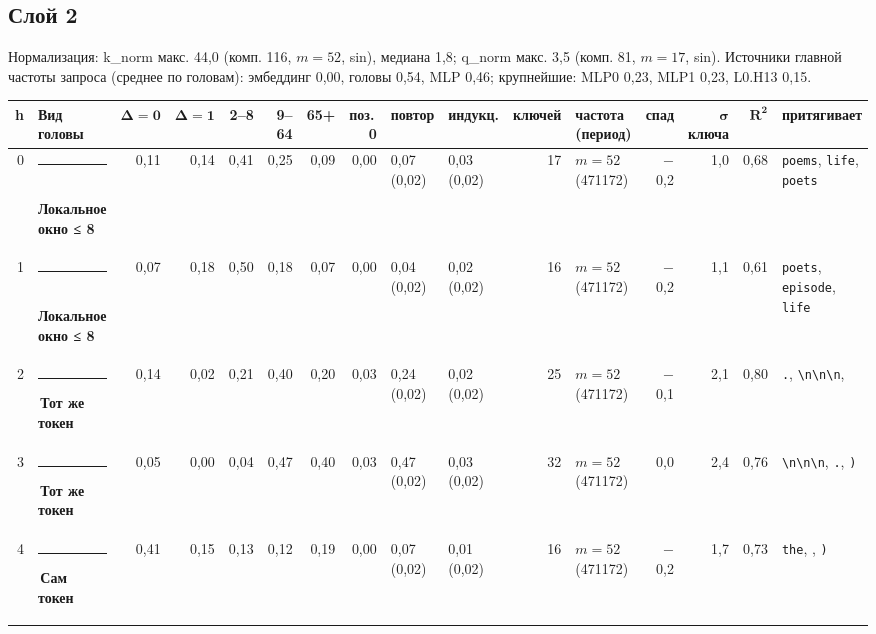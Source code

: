\documentclass[10pt]{article}
\begin{document}
\noindent\begin{minipage}{\linewidth}
\subsection*{Слой 2}
{\small\color{ink2} Нормализация: k\_norm макс. 44,0 (комп. 116, $m{=}52$, sin), медиана 1,8; q\_norm макс. 3,5 (комп. 81, $m{=}17$, sin). Источники главной частоты запроса (среднее по головам): эмбеддинг 0,00, головы 0,54, MLP 0,46; крупнейшие: MLP0 0,23, MLP1 0,23, L0.H13 0,15.}
\begin{center}{\footnotesize\begin{tabular}{|r|l|r|r|r|r|r|r|l|l|r|l|r|r|r|l|}
\hline
\rowcolor{head}\textbf{h} & \textbf{Вид головы} & $\boldsymbol{\Delta{=}0}$ & $\boldsymbol{\Delta{=}1}$ & \textbf{2–8} & \textbf{9–64} & \textbf{65+} & \textbf{поз.\,0} & \textbf{повтор} & \textbf{индукц.} & \textbf{ключей} & \textbf{частота (период)} & \textbf{спад} & $\boldsymbol{\sigma}$ \textbf{ключа} & $\boldsymbol{R^2}$ & \textbf{притягивает} \\ \hline
0 & \textcolor[HTML]{1BAF7A}{\rule{0.62em}{0.62em}}\,\textbf{Локальное окно ≤ 8} & 0,11 & 0,14 & 0,41 & 0,25 & 0,09 & 0,00 & 0,07 (0,02) & 0,03 (0,02) & 17 & $m{=}52$ (471172) & $-$0,2 & 1,0 & 0,68 & \texttt{\textvisiblespace{}poems}, \texttt{\textvisiblespace{}life}, \texttt{\textvisiblespace{}poets} \\ \hline
1 & \textcolor[HTML]{1BAF7A}{\rule{0.62em}{0.62em}}\,\textbf{Локальное окно ≤ 8} & 0,07 & 0,18 & 0,50 & 0,18 & 0,07 & 0,00 & 0,04 (0,02) & 0,02 (0,02) & 16 & $m{=}52$ (471172) & $-$0,2 & 1,1 & 0,61 & \texttt{\textvisiblespace{}poets}, \texttt{\textvisiblespace{}episode}, \texttt{\textvisiblespace{}life} \\ \hline
2 & \textcolor[HTML]{E87BA4}{\rule{0.62em}{0.62em}}\,\textbf{Тот же токен} & 0,14 & 0,02 & 0,21 & 0,40 & 0,20 & 0,03 & 0,24 (0,02) & 0,02 (0,02) & 25 & $m{=}52$ (471172) & $-$0,1 & 2,1 & 0,80 & \texttt{\textvisiblespace{}.}, \texttt{\textvisiblespace{}\textbackslash{}n\textbackslash{}n\textbackslash{}n}, \texttt{\textvisiblespace{}} \\ \hline
3 & \textcolor[HTML]{E87BA4}{\rule{0.62em}{0.62em}}\,\textbf{Тот же токен} & 0,05 & 0,00 & 0,04 & 0,47 & 0,40 & 0,03 & 0,47 (0,02) & 0,03 (0,02) & 32 & $m{=}52$ (471172) & 0,0 & 2,4 & 0,76 & \texttt{\textvisiblespace{}\textbackslash{}n\textbackslash{}n\textbackslash{}n}, \texttt{\textvisiblespace{}.}, \texttt{\textvisiblespace{})} \\ \hline
4 & \textcolor[HTML]{2A78D6}{\rule{0.62em}{0.62em}}\,\textbf{Сам токен} & 0,41 & 0,15 & 0,13 & 0,12 & 0,19 & 0,00 & 0,07 (0,02) & 0,01 (0,02) & 16 & $m{=}52$ (471172) & $-$0,2 & 1,7 & 0,73 & \texttt{\textvisiblespace{}the}, \texttt{\textvisiblespace{}}, \texttt{\textvisiblespace{})} \\ \hline

\end{tabular}}
\end{center}
\end{minipage}
\end{document}
